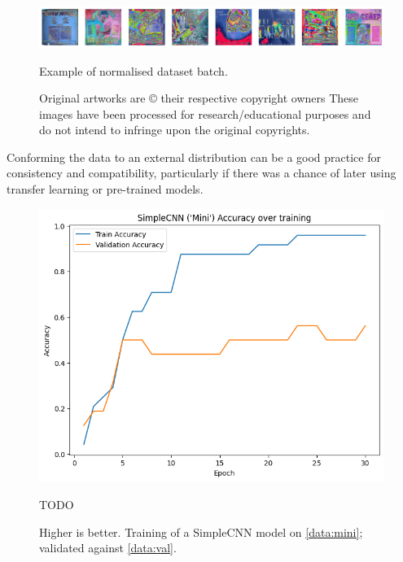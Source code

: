                 \begin{figure}[h]
                    \centering
                    \includegraphics[width=\textwidth]{images/NormalisedArts.png}
                    \caption{Example of normalised dataset batch.}
                    \label{fig:normalisedArts}
                    \caption*{
                        Original artworks are © their respective copyright owners
                        \footnotesize These images have been processed for research/educational purposes and do not intend to infringe upon the original copyrights.
                    }
                \end{figure}
    
                Conforming the data to an external distribution can be a good practice for consistency and compatibility, particularly if there was a chance of later using transfer learning or pre-trained models.
    
    
                \begin{figure}[h]
                    \centering
                    \includegraphics[width=\textwidth]{images/SimpleCNN-Mini_Train.png}
                    \caption{TODO}
                    \label{fig:SimpleCNN-Mini_Train}
                    \caption*{Higher is better. Training of a SimpleCNN model on \ref{data:mini}; validated against \ref{data:val}.}
                \end{figure}
    
